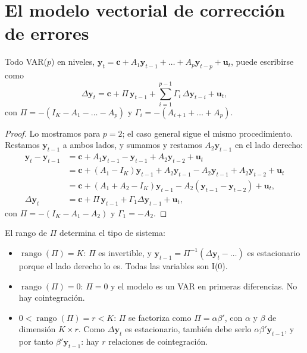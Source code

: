 \section{El modelo vectorial de corrección de errores}

\begin{proposicion}\label{prop:vecm}
Todo VAR($p$) en niveles,
$\mathbf y_t=\mathbf c+A_1\mathbf y_{t-1}+\dots+A_p\mathbf y_{t-p}+\mathbf u_t$, puede escribirse como
\[
  \Delta\mathbf y_t=\mathbf c+\Pi\,\mathbf y_{t-1}+\sum_{i=1}^{p-1}\Gamma_i\,\Delta\mathbf y_{t-i}+\mathbf u_t,
\]
con $\Pi=-(I_K-A_1-\dots-A_p)$ y $\Gamma_i=-(A_{i+1}+\dots+A_p)$.
\end{proposicion}

\begin{proof}
Lo mostramos para $p=2$; el caso general sigue el mismo procedimiento. Restamos $\mathbf y_{t-1}$ a ambos lados,
y sumamos y restamos $A_2\mathbf y_{t-1}$ en el lado derecho:
\begin{align*}
  \mathbf y_t-\mathbf y_{t-1} &= \mathbf c+A_1\mathbf y_{t-1}-\mathbf y_{t-1}+A_2\mathbf y_{t-2}+\mathbf u_t\\
                              &= \mathbf c+(A_1-I_K)\mathbf y_{t-1}+A_2\mathbf y_{t-1}-A_2\mathbf y_{t-1}+A_2\mathbf y_{t-2}+\mathbf u_t\\
                              &= \mathbf c+(A_1+A_2-I_K)\mathbf y_{t-1}-A_2(\mathbf y_{t-1}-\mathbf y_{t-2})+\mathbf u_t,\\[4pt]
  \Delta\mathbf y_t           &= \mathbf c+\Pi\,\mathbf y_{t-1}+\Gamma_1\Delta\mathbf y_{t-1}+\mathbf u_t,
\end{align*}
con $\Pi=-(I_K-A_1-A_2)$ y $\Gamma_1=-A_2$.
\end{proof}

El rango de $\Pi$ determina el tipo de sistema:
\begin{itemize}[leftmargin=*]
  \item $\operatorname{rango}(\Pi)=K$: $\Pi$ es invertible, y $\mathbf y_{t-1}=\Pi^{-1}(\Delta\mathbf y_t-\dots)$ es
        estacionario porque el lado derecho lo es. Todas las variables son I(0).
  \item $\operatorname{rango}(\Pi)=0$: $\Pi=0$ y el modelo es un VAR en primeras diferencias. No hay cointegración.
  \item $0<\operatorname{rango}(\Pi)=r<K$: $\Pi$ se factoriza como $\Pi=\alpha\beta'$, con $\alpha$ y $\beta$ de
        dimensión $K\times r$. Como $\Delta\mathbf y_t$ es estacionario, también debe serlo
        $\alpha\beta'\mathbf y_{t-1}$, y por tanto $\beta'\mathbf y_{t-1}$: hay $r$ relaciones de
        cointegración.
\end{itemize}

